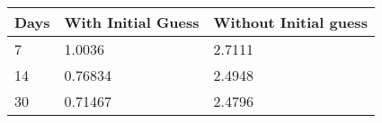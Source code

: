 \begin{tabular}{lll}
Days & With Initial Guess & Without Initial guess \\ 
\hline 
7 & 1.0036 & 2.7111 \\ 
14 & 0.76834 & 2.4948 \\ 
30 & 0.71467 & 2.4796 \\ 
\hline 
\end{tabular}